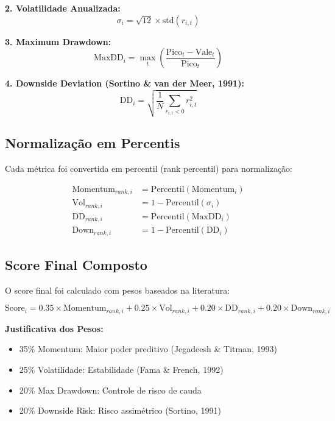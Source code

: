 \textbf{2. Volatilidade Anualizada:}
\begin{equation}
\sigma_{i} = \sqrt{12} \times \text{std}(r_{i,t})
\end{equation}

\textbf{3. Maximum Drawdown:}
\begin{equation}
\text{MaxDD}_{i} = \max_{t} \left( \frac{\text{Pico}_{t} - \text{Vale}_{t}}{\text{Pico}_{t}} \right)
\end{equation}

\textbf{4. Downside Deviation (Sortino \& van der Meer, 1991):}
\begin{equation}
\text{DD}_{i} = \sqrt{\frac{1}{N} \sum_{r_{i,t} < 0} r_{i,t}^2}
\end{equation}

\subsection{Normalização em Percentis}

Cada métrica foi convertida em percentil (rank percentil) para normalização:

\begin{align}
\text{Momentum}_{rank,i} &= \text{Percentil}(\text{Momentum}_{i}) \\
\text{Vol}_{rank,i} &= 1 - \text{Percentil}(\sigma_{i}) \\
\text{DD}_{rank,i} &= \text{Percentil}(\text{MaxDD}_{i}) \\
\text{Down}_{rank,i} &= 1 - \text{Percentil}(\text{DD}_{i})
\end{align}

\subsection{Score Final Composto}

O score final foi calculado com pesos baseados na literatura:

\begin{equation}
\text{Score}_{i} = 0.35 \times \text{Momentum}_{rank,i} + 0.25 \times \text{Vol}_{rank,i} + 0.20 \times \text{DD}_{rank,i} + 0.20 \times \text{Down}_{rank,i}
\end{equation}

\textbf{Justificativa dos Pesos:}
\begin{itemize}
    \item 35\% Momentum: Maior poder preditivo (Jegadeesh \& Titman, 1993)
    \item 25\% Volatilidade: Estabilidade (Fama \& French, 1992)
    \item 20\% Max Drawdown: Controle de risco de cauda
    \item 20\% Downside Risk: Risco assimétrico (Sortino, 1991)
\end{itemize}

